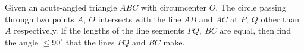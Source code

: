 Given an acute-angled triangle $ ABC$ with circumcenter $ O.$ The circle passing through two points $ A,\ O$ intersects with the line $ AB$ and $ AC$ at $ P,\ Q$ other than $ A$ respectively. If the lengths of the line segments $ PQ,\ BC$ are equal, then find the angle $ \leq 90^\circ$ that the lines $ PQ$ and $ BC$ make.